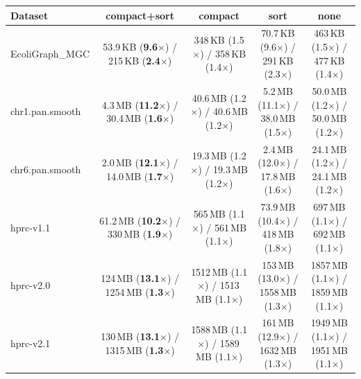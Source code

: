 \setlength{\tabcolsep}{2pt}
\begin{tabular}{l|c|c|c|c}
  \hline
  \textbf{Dataset}    & \textbf{compact+sort} & \textbf{compact} & \textbf{sort} & \textbf{none} \\
  \hline
  EcoliGraph\_MGC     &
  53.9\,KB (\textbf{9.6$\times$}) / 215\,KB (\textbf{2.4$\times$})    &
  348\,KB (1.5$\times$) / 358\,KB (1.4$\times$)                       &
  70.7\,KB (9.6$\times$) / 291\,KB (2.3$\times$)                      &
  463\,KB (1.5$\times$) / 477\,KB (1.4$\times$)                       \\
  chr1.pan.smooth     &
  4.3\,MB (\textbf{11.2$\times$}) / 30.4\,MB (\textbf{1.6$\times$})   &
  40.6\,MB (1.2$\times$) / 40.6\,MB (1.2$\times$)                     &
  5.2\,MB (11.1$\times$) / 38.0\,MB (1.5$\times$)                     &
  50.0\,MB (1.2$\times$) / 50.0\,MB (1.2$\times$)                     \\
  chr6.pan.smooth     &
  2.0\,MB (\textbf{12.1$\times$}) / 14.0\,MB (\textbf{1.7$\times$})   &
  19.3\,MB (1.2$\times$) / 19.3\,MB (1.2$\times$)                     &
  2.4\,MB (12.0$\times$) / 17.8\,MB (1.6$\times$)                     &
  24.1\,MB (1.2$\times$) / 24.1\,MB (1.2$\times$)                     \\
  hprc-v1.1           &
  61.2\,MB (\textbf{10.2$\times$}) / 330\,MB (\textbf{1.9$\times$})   &
  565\,MB (1.1$\times$) / 561\,MB (1.1$\times$)                       &
  73.9\,MB (10.4$\times$) / 418\,MB (1.8$\times$)                     &
  697\,MB (1.1$\times$) / 692\,MB (1.1$\times$)                       \\
  hprc-v2.0           &
  124\,MB (\textbf{13.1$\times$}) / 1254\,MB (\textbf{1.3$\times$})   &
  1512\,MB (1.1$\times$) / 1513\,MB (1.1$\times$)                     &
  153\,MB (13.0$\times$) / 1558\,MB (1.3$\times$)                     &
  1857\,MB (1.1$\times$) / 1859\,MB (1.1$\times$)                     \\
  hprc-v2.1           &
  130\,MB (\textbf{13.1$\times$}) / 1315\,MB (\textbf{1.3$\times$})   &
  1588\,MB (1.1$\times$) / 1589\,MB (1.1$\times$)                     &
  161\,MB (12.9$\times$) / 1632\,MB (1.3$\times$)                     &
  1949\,MB (1.1$\times$) / 1951\,MB (1.1$\times$)                     \\
  \hline
\end{tabular}
